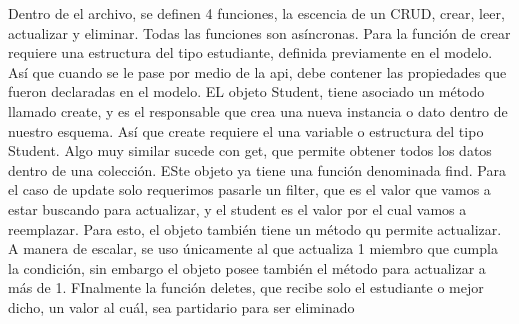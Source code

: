 \documentclass[12pt,a4paper]{report}
\begin{document}
Dentro de el archivo, se definen 4 funciones, la escencia de un CRUD, crear, leer, actualizar y eliminar. Todas las funciones son asíncronas. Para la función de crear requiere una estructura del tipo estudiante, definida previamente en el modelo. Así que cuando se le pase por medio de la api, debe contener las propiedades que fueron declaradas en el modelo. EL objeto Student, tiene asociado un método llamado create, y es el responsable que crea una nueva instancia o dato dentro de nuestro esquema. Así que create requiere el una variable o estructura del tipo Student.
Algo muy similar sucede con get, que permite obtener todos los datos dentro de una colección. ESte objeto ya tiene una función denominada find. Para el caso de update solo requerimos pasarle un filter, que es el valor que vamos a estar buscando para actualizar, y el student es el valor por el cual vamos a reemplazar. Para esto, el objeto también tiene un método qu permite actualizar. A manera de escalar, se uso únicamente al que actualiza 1 miembro que cumpla la condición, sin embargo el objeto posee también el método para actualizar a más de 1. FInalmente la función deletes, que recibe solo el estudiante o mejor dicho, un valor al cuál, sea partidario para ser eliminado
\end{document}
